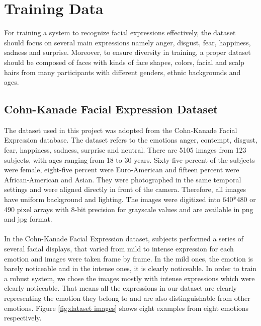 \section{Training Data}


For training a system to recognize facial expressions effectively, the dataset should focus on several main expressions namely anger, disgust, fear, happiness, sadness and surprise. Moreover, to ensure diversity in training, a proper dataset should be composed of faces with kinds of face shapes, colors, facial and scalp hairs from many participants with different genders, ethnic backgrounds and ages.


\subsection{Cohn-Kanade Facial Expression Dataset}
\nocite{Kanade2000CK+}\nocite{Lucey2010CK+}

The dataset used in this project was adopted from the Cohn-Kanade Facial Expression database. The dataset refers to the emotions anger, contempt, disgust, fear, happiness, sadness, surprise and neutral. There are 5105 images from 123 subjects, with ages ranging from 18 to 30 years. Sixty-five percent of the subjects were female, eight-five percent were Euro-American and fifteen percent were African-American and Asian. They were photographed in the same temporal settings and were aligned directly in front of the camera. Therefore, all images have uniform background and lighting. The images were digitized into 640*480 or 490 pixel arrays with 8-bit precision for grayscale values and are available in png and jpg format.
\\
\\
In the Cohn-Kanade Facial Expression dataset, subjects performed a series of several facial displays, that varied from mild to intense expression for each emotion and images were taken frame by frame. In the mild ones, the emotion is barely noticeable and in the intense ones, it is clearly noticeable. In order to train a robust system, we chose the images mostly with intense expressions which were clearly noticeable. That means all the expressions in our dataset are clearly representing the emotion they belong to and are also distinguishable from other emotions. Figure \ref{fig:dataset images} shows eight examples from eight emotions respectively.


